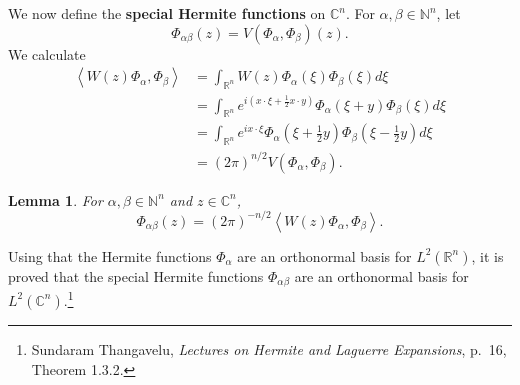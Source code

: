 \documentclass{article}
\newcommand{\inner}[2]{\left\langle #1, #2 \right\rangle}
\newtheorem{lemma}[theorem]{Lemma}
\theoremstyle{definition}
\begin{document}
We now define the \textbf{special Hermite functions} on $\mathbb{C}^n$. For $\alpha,\beta \in \mathbb{N}^n$, let
\[
\Phi_{\alpha \beta}(z) = V(\Phi_\alpha,\Phi_\beta)(z).
\]
We calculate
\begin{align*}
\inner{W(z)\Phi_\alpha}{\Phi_\beta}&=\int_{\mathbb{R}^n} W(z)\Phi_\alpha(\xi) \Phi_\beta(\xi) d\xi\\
&=\int_{\mathbb{R}^n} e^{i\left(x\cdot \xi+\frac{1}{2}x\cdot y\right)} \Phi_\alpha(\xi+y) \Phi_\beta(\xi) d\xi\\
&=\int_{\mathbb{R}^n} e^{ix\cdot \xi} \Phi_\alpha\left(\xi+\frac{1}{2}y\right) \Phi_\beta\left(\xi-\frac{1}{2}y\right) d\xi\\
&=(2\pi)^{n/2} V(\Phi_\alpha,\Phi_\beta).
\end{align*}

\begin{lemma}
For $\alpha,\beta \in \mathbb{N}^n$ and $z \in \mathbb{C}^n$,
\[
\Phi_{\alpha\beta}(z) = (2\pi)^{-n/2} \inner{W(z)\Phi_\alpha}{\Phi_\beta}.
\]
\end{lemma}

Using that the Hermite functions $\Phi_\alpha$ are an orthonormal basis for $L^2(\mathbb{R}^n)$, it is proved that the special Hermite functions
$\Phi_{\alpha\beta}$ are an orthonormal basis for $L^2(\mathbb{C}^n)$.\footnote{Sundaram Thangavelu, {\em Lectures on Hermite and Laguerre Expansions},
p.~16, Theorem 1.3.2.}
\end{document}
